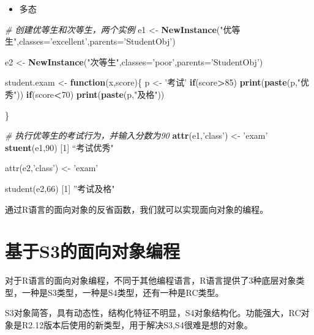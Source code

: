 \documentclass[]{book}
\newenvironment{Shaded}{\begin{snugshade}}{\end{snugshade}}
\newcommand{\KeywordTok}[1]{\textcolor[rgb]{0.13,0.29,0.53}{\textbf{#1}}}
\newcommand{\DataTypeTok}[1]{\textcolor[rgb]{0.13,0.29,0.53}{#1}}
\newcommand{\DecValTok}[1]{\textcolor[rgb]{0.00,0.00,0.81}{#1}}
\newcommand{\StringTok}[1]{\textcolor[rgb]{0.31,0.60,0.02}{#1}}
\newcommand{\CommentTok}[1]{\textcolor[rgb]{0.56,0.35,0.01}{\textit{#1}}}
\newcommand{\ControlFlowTok}[1]{\textcolor[rgb]{0.13,0.29,0.53}{\textbf{#1}}}
\newcommand{\OperatorTok}[1]{\textcolor[rgb]{0.81,0.36,0.00}{\textbf{#1}}}
\newcommand{\NormalTok}[1]{#1}
\providecommand{\tightlist}{%
  \setlength{\itemsep}{0pt}\setlength{\parskip}{0pt}}
\begin{document}
\begin{itemize}
\tightlist
\item
  多态
\end{itemize}

\begin{Shaded}
\begin{Highlighting}[]
\CommentTok{# 创建优等生和次等生，两个实例}
\NormalTok{e1 <-}\StringTok{ }\KeywordTok{NewInstance}\NormalTok{(}\StringTok{"优等生"}\NormalTok{,}\DataTypeTok{classes=}\StringTok{'excellent'}\NormalTok{,}\DataTypeTok{parents=}\StringTok{'StudentObj'}\NormalTok{)}

\NormalTok{e2 <-}\StringTok{ }\KeywordTok{NewInstance}\NormalTok{(}\StringTok{"次等生"}\NormalTok{,}\DataTypeTok{classes=}\StringTok{'poor'}\NormalTok{,}\DataTypeTok{parents=}\StringTok{'StudentObj'}\NormalTok{)}

\NormalTok{student.exam <-}\StringTok{ }\ControlFlowTok{function}\NormalTok{(x,score)\{}
\NormalTok{  p <-}\StringTok{ '考试'}
  \ControlFlowTok{if}\NormalTok{(score}\OperatorTok{>}\DecValTok{85}\NormalTok{) }\KeywordTok{print}\NormalTok{(}\KeywordTok{paste}\NormalTok{(p,}\StringTok{"优秀"}\NormalTok{))}
  \ControlFlowTok{if}\NormalTok{(score}\OperatorTok{<}\DecValTok{70}\NormalTok{) }\KeywordTok{print}\NormalTok{(}\KeywordTok{paste}\NormalTok{(p,}\StringTok{"及格"}\NormalTok{))}

\NormalTok{\}}

\CommentTok{# 执行优等生的考试行为，并输入分数为90}
\KeywordTok{attr}\NormalTok{(e1,}\StringTok{'class'}\NormalTok{) <-}\StringTok{ 'exam'}
\KeywordTok{stuent}\NormalTok{(e1,}\DecValTok{90}\NormalTok{)}
\NormalTok{[}\DecValTok{1}\NormalTok{] “考试优秀}\StringTok{"}

\StringTok{attr(e2,'class') <- 'exam'}

\StringTok{student(e2,66)}
\StringTok{[1] ”考试及格"}
\end{Highlighting}
\end{Shaded}

通过R语言的面向对象的反省函数，我们就可以实现面向对象的编程。

\chapter{基于S3的面向对象编程}\label{S3}

对于R语言的面向对象编程，不同于其他编程语言，R语言提供了3种底层对象类型，一种是S3类型，一种是S4类型，还有一种是RC类型。

S3对象简答，具有动态性，结构化特征不明显，S4对象结构化。功能强大，RC对象是R2.12版本后使用的新类型，用于解决S3,S4很难是想的对象。
\end{document}
